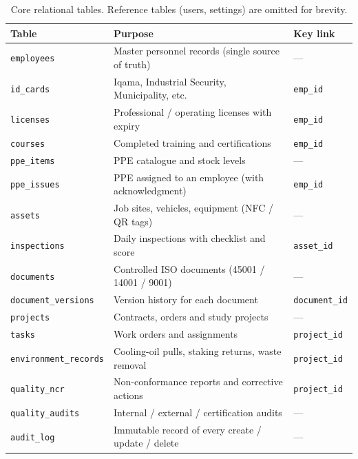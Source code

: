 \documentclass[11pt]{article}
\begin{document}
\begin{table}[H]
\centering\small
\begin{tabular}{@{}l p{7.2cm} l@{}}
\toprule
\textbf{Table} & \textbf{Purpose} & \textbf{Key link} \\
\midrule
\texttt{employees}          & Master personnel records (single source of truth) & --- \\
\texttt{id\_cards}          & Iqama, Industrial Security, Municipality, etc.     & \texttt{emp\_id} \\
\texttt{licenses}           & Professional / operating licenses with expiry      & \texttt{emp\_id} \\
\texttt{courses}            & Completed training and certifications              & \texttt{emp\_id} \\
\texttt{ppe\_items}         & PPE catalogue and stock levels                     & --- \\
\texttt{ppe\_issues}        & PPE assigned to an employee (with acknowledgment)  & \texttt{emp\_id} \\
\texttt{assets}             & Job sites, vehicles, equipment (NFC / QR tags)     & --- \\
\texttt{inspections}        & Daily inspections with checklist and score         & \texttt{asset\_id} \\
\texttt{documents}          & Controlled ISO documents (45001 / 14001 / 9001)    & --- \\
\texttt{document\_versions} & Version history for each document                  & \texttt{document\_id} \\
\texttt{projects}           & Contracts, orders and study projects               & --- \\
\texttt{tasks}              & Work orders and assignments                        & \texttt{project\_id} \\
\texttt{environment\_records}& Cooling-oil pulls, staking returns, waste removal & \texttt{project\_id} \\
\texttt{quality\_ncr}       & Non-conformance reports and corrective actions     & \texttt{project\_id} \\
\texttt{quality\_audits}    & Internal / external / certification audits         & --- \\
\texttt{audit\_log}         & Immutable record of every create / update / delete & --- \\
\bottomrule
\end{tabular}
\caption{Core relational tables. Reference tables (users, settings) are omitted for brevity.}
\end{table}
\end{document}
